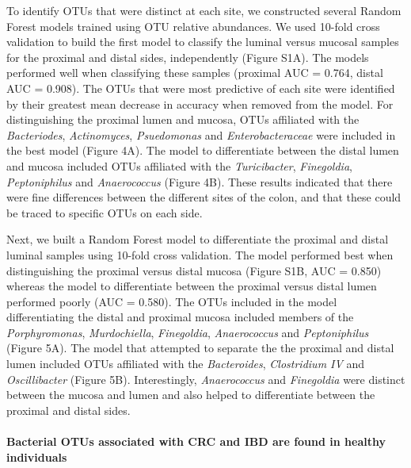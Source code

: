 \documentclass[12pt,]{article}
\let\oldparagraph\paragraph
\renewcommand{\paragraph}[1]{\oldparagraph{#1}\mbox{}}
\begin{document}
To identify OTUs that were distinct at each site, we constructed several
Random Forest models trained using OTU relative abundances. We used
10-fold cross validation to build the first model to classify the
luminal versus mucosal samples for the proximal and distal sides,
independently (Figure S1A). The models performed well when classifying
these samples (proximal AUC = 0.764, distal AUC = 0.908). The OTUs that
were most predictive of each site were identified by their greatest mean
decrease in accuracy when removed from the model. For distinguishing the
proximal lumen and mucosa, OTUs affiliated with the \emph{Bacteriodes},
\emph{Actinomyces}, \emph{Psuedomonas} and \emph{Enterobacteraceae} were
included in the best model (Figure 4A). The model to differentiate
between the distal lumen and mucosa included OTUs affiliated with the
\emph{Turicibacter}, \emph{Finegoldia}, \emph{Peptoniphilus} and
\emph{Anaerococcus} (Figure 4B). These results indicated that there were
fine differences between the different sites of the colon, and that
these could be traced to specific OTUs on each side.

Next, we built a Random Forest model to differentiate the proximal and
distal luminal samples using 10-fold cross validation. The model
performed best when distinguishing the proximal versus distal mucosa
(Figure S1B, AUC = 0.850) whereas the model to differentiate between the
proximal versus distal lumen performed poorly (AUC = 0.580). The OTUs
included in the model differentiating the distal and proximal mucosa
included members of the \emph{Porphyromonas}, \emph{Murdochiella},
\emph{Finegoldia}, \emph{Anaerococcus} and \emph{Peptoniphilus} (Figure
5A). The model that attempted to separate the the proximal and distal
lumen included OTUs affiliated with the \emph{Bacteroides},
\emph{Clostridium IV} and \emph{Oscillibacter} (Figure 5B).
Interestingly, \emph{Anaerococcus} and \emph{Finegoldia} were distinct
between the mucosa and lumen and also helped to differentiate between
the proximal and distal sides.

\paragraph{Bacterial OTUs associated with CRC and IBD are found in
healthy
individuals}\label{bacterial-otus-associated-with-crc-and-ibd-are-found-in-healthy-individuals}
\end{document}

